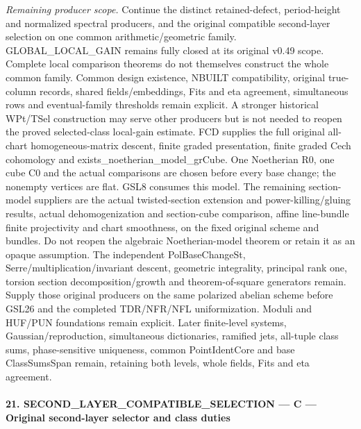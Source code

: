 \documentclass[11pt,a4paper]{article}
\numberwithin{equation}{section}
\theoremstyle{remark}\newtheorem{remark}[theorem]{Remark}
\begin{document}
\emph{Remaining producer scope.} Continue the distinct retained-defect, period-height and normalized spectral producers, and the original compatible second-layer selection on one common arithmetic/geometric family. GLOBAL\_\allowbreak LOCAL\_\allowbreak GAIN remains fully closed at its original v0.49 scope. Complete local comparison theorems do not themselves construct the whole common family. Common design existence, NBUILT compatibility, original true-column records, shared fields/embeddings, Fits and eta agreement, simultaneous rows and eventual-family thresholds remain explicit. A stronger historical WPt/TSel construction may serve other producers but is not needed to reopen the proved selected-class local-gain estimate. FCD supplies the full original all-chart homogeneous-matrix descent, finite graded presentation, finite graded Cech cohomology and exists\_\allowbreak noetherian\_\allowbreak model\_\allowbreak grCube. One Noetherian R0, one cube C0 and the actual comparisons are chosen before every base change; the nonempty vertices are flat. GSL8 consumes this model. The remaining section-model suppliers are the actual twisted-section extension and power-killing/gluing results, actual dehomogenization and section-cube comparison, affine line-bundle finite projectivity and chart smoothness, on the fixed original scheme and bundles. Do not reopen the algebraic Noetherian-model theorem or retain it as an opaque assumption. The independent PolBaseChangeSt, Serre/multiplication/invariant descent, geometric integrality, principal rank one, torsion section decomposition/growth and theorem-of-square generators remain. Supply those original producers on the same polarized abelian scheme before GSL26 and the completed TDR/NFR/NFL uniformization. Moduli and HUF/PUN foundations remain explicit. Later finite-level systems, Gaussian/reproduction, simultaneous dictionaries, ramified jets, all-tuple class sums, phase-sensitive uniqueness, common PointIdentCore and base ClassSumsSpan remain, retaining both levels, whole fields, Fits and eta agreement.



\paragraph{21. SECOND\_\allowbreak LAYER\_\allowbreak COMPATIBLE\_\allowbreak SELECTION — C — Original second-layer selector and class duties}
\end{document}
